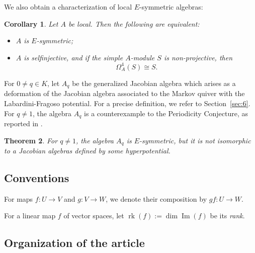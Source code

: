 \documentclass[12pt,reqno]{amsart}
\newtheorem{Thm}{Theorem}[section]
\newtheorem{Cor}[Thm]{Corollary}
\theoremstyle{definition}
\newcommand{\df}{\colon}
\newcommand{\rk}{\operatorname{rk}}
\newcommand{\Ima}{\operatorname{Im}}
\begin{document}
We also obtain a characterization of local $E$-symmetric algebras:

\begin{Cor}\label{cor:main4}
Let $A$ be local.
Then the following are equivalent:
\begin{itemize}\itemsep2mm

\item[(i)]
$A$ is $E$-symmetric;

\item[(ii)]
$A$ is selfinjective, and if the simple $A$-module $S$ is
non-projective, then
$$
\Omega_A^4(S) \cong S.
$$

\end{itemize}
\end{Cor}


For $0 \not= q \in K$, let $A_q$ be the generalized Jacobian algebra
which arises as a deformation of the Jacobian algebra associated to the Markov quiver with the Labardini-Fragoso potential.
For a precise definition, we refer to Section~\ref{sec:6}.
For $q \not= 1$, the algebra $A_q$ is a counterexample to 
the Periodicity Conjecture, as reported in \cite{E26}.


\begin{Thm}\label{thm:main3}
For $q \not= 1$,
the algebra $A_q$ is $E$-symmetric, but it is not isomorphic to a Jacobian algebras defined by
some hyperpotential.
\end{Thm}

\subsection{Conventions}
For maps $f\df U \to V$ and $g\df V \to W$, we denote their
composition by $gf\df U \to W$.

For a linear map $f$ of vector spaces, let $\rk(f) := \dim \Ima(f)$
be its \emph{rank}.


\subsection{Organization of the article}
\end{document}
